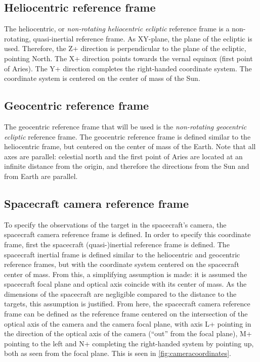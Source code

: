 \documentclass[a4paper,10pt]{article}
\begin{document}
\subsection{Heliocentric reference frame}
The heliocentric, or \textit{non-rotating heliocentric ecliptic} reference frame is a non-rotating, quasi-inertial reference frame. As XY-plane, the plane of the ecliptic is used. Therefore, the Z+ direction is perpendicular to the plane of the ecliptic, pointing North. The X+ direction points towards the vernal equinox (first point of Aries). The Y+ direction completes the right-handed coordinate system. The coordinate system is centered on the center of mass of the Sun.

\subsection{Geocentric reference frame}
The geocentric reference frame that will be used is the \textit{non-rotating geocentric ecliptic} reference frame. The geocentric reference frame is defined similar to the heliocentric frame, but centered on the center of mass of the Earth. Note that all axes are parallel: celestial north and the first point of Aries are located at an infinite distance from the origin, and therefore the directions from the Sun and from Earth are parallel.

\subsection{Spacecraft camera reference frame}
To specify the observations of the target in the spacecraft's camera, the spacecraft camera reference frame is defined. In order to specify this coordinate frame, first the spacecraft (quasi-)inertial reference frame is defined. The spacecraft inertial frame is defined similar to the heliocentric and geocentric reference frames, but with the coordinate system centered on the spacecraft center of mass. From this, a simplifying assumption is made: it is assumed the spacecraft focal plane and optical axis coincide with its center of mass. As the dimensions of the spacecraft are negligible compared to the distance to the targets, this assumption is justified. From here, the spacecraft camera reference frame can be defined as the reference frame centered on the intersection of the optical axis of the camera and the camera focal plane, with axis L+ pointing in the direction of the optical axis of the camera (``out'' from the focal plane), M+ pointing to the left and N+ completing the right-handed system by pointing up, both as seen from the focal plane. This is seen in \autoref{fig:cameracoordinates}.
\end{document}
